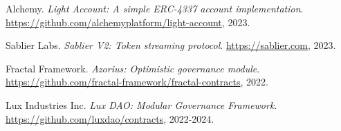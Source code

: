 \documentclass[11pt,a4paper]{article}
\begin{document}
\begin{thebibliography}{99}
Alchemy.
\textit{Light Account: A simple ERC-4337 account implementation}.
\url{https://github.com/alchemyplatform/light-account}, 2023.

Sablier Labs.
\textit{Sablier V2: Token streaming protocol}.
\url{https://sablier.com}, 2023.

Fractal Framework.
\textit{Azorius: Optimistic governance module}.
\url{https://github.com/fractal-framework/fractal-contracts}, 2022.

Lux Industries Inc.
\textit{Lux DAO: Modular Governance Framework}.
\url{https://github.com/luxdao/contracts}, 2022-2024.

\end{thebibliography}
\end{document}
